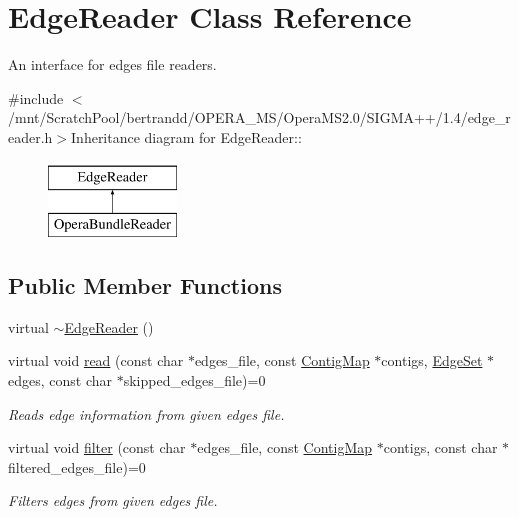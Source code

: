 \hypertarget{classEdgeReader}{
\section{EdgeReader Class Reference}
\label{classEdgeReader}
}


An interface for edges file readers.  


{\ttfamily \#include $<$/mnt/ScratchPool/bertrandd/OPERA\_\-MS/OperaMS2.0/SIGMA++/1.4/edge\_\-reader.h$>$}Inheritance diagram for EdgeReader::\begin{figure}[H]
\begin{center}
\leavevmode
\includegraphics[height=2cm]{classEdgeReader}
\end{center}
\end{figure}
\subsection*{Public Member Functions}
\begin{DoxyCompactItemize}
\item 
virtual \hyperlink{classEdgeReader_ab3378e9200f9da264cbc2d552c56ad1f}{$\sim$EdgeReader} ()
\item 
virtual void \hyperlink{classEdgeReader_a3c929904fe67018b74f4c180bada33dd}{read} (const char $\ast$edges\_\-file, const \hyperlink{contig_8h_aa2acb8d3b78def617ec4509a1f684c4e}{ContigMap} $\ast$contigs, \hyperlink{edge_8h_ad07b5df6e7cfe15cad88e3b25d48c84f}{EdgeSet} $\ast$edges, const char $\ast$skipped\_\-edges\_\-file)=0
\begin{DoxyCompactList}\small\item\em Reads edge information from given edges file. \item\end{DoxyCompactList}\item 
virtual void \hyperlink{classEdgeReader_a422beb33051ce84d62a600325aa058e1}{filter} (const char $\ast$edges\_\-file, const \hyperlink{contig_8h_aa2acb8d3b78def617ec4509a1f684c4e}{ContigMap} $\ast$contigs, const char $\ast$filtered\_\-edges\_\-file)=0
\begin{DoxyCompactList}\small\item\em Filters edges from given edges file. \item\end{DoxyCompactList}\end{DoxyCompactItemize}


